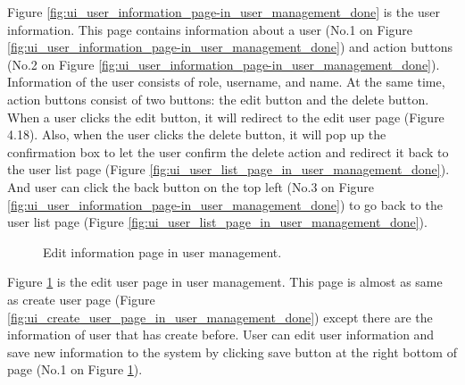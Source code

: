 \documentclass[12pt,oneside,openright,a4paper]{cpe-english-project}
\begin{document}
Figure \ref*{fig:ui_user_information_page-in_user_management_done} is the user information. This page contains information about a user (No.1 on Figure  \ref*{fig:ui_user_information_page-in_user_management_done}) and action buttons (No.2 on Figure  \ref*{fig:ui_user_information_page-in_user_management_done}). Information of the user consists of role, username, and name. At the same time, action buttons consist of two buttons: the edit button and the delete button. When a user clicks the edit button, it will redirect to the edit user page (Figure 4.18). Also, when the user clicks the delete button, it will pop up the confirmation box to let the user confirm the delete action and redirect it back to the user list page (Figure  \ref*{fig:ui_user_list_page_in_user_management_done}). And user can click the back button on the top left (No.3 on Figure  \ref*{fig:ui_user_information_page-in_user_management_done}) to go back to the user list page (Figure  \ref*{fig:ui_user_list_page_in_user_management_done}).

\begin{figure}[!h]\centering
		\caption{Edit information page in user management.}\label{fig:ui_edit_information_page_in_user_management_done}
	\end{figure}
Figure \ref*{fig:ui_edit_information_page_in_user_management_done} is the edit user page in user management. This page is almost as same as 
create user page (Figure \ref*{fig:ui_create_user_page_in_user_management_done}) except there are the information of user that has create before. 
User can edit user information and save new information to the system by clicking save 
button at the right bottom of page (No.1 on Figure \ref*{fig:ui_edit_information_page_in_user_management_done}).
\end{document}

